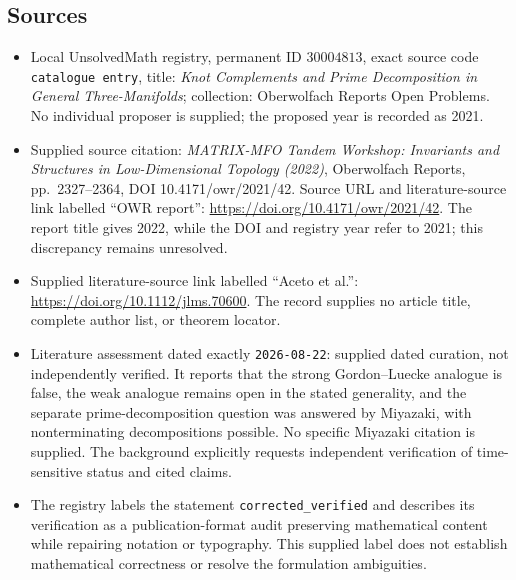 \documentclass[11pt]{article}
\begin{document}
\subsection{Sources}
\begin{itemize}
\item Local UnsolvedMath registry, permanent ID \(30004813\), exact source code \texttt{catalogue entry}, title: \emph{Knot Complements and Prime Decomposition in General Three-Manifolds}; collection: Oberwolfach Reports Open Problems. No individual proposer is supplied; the proposed year is recorded as 2021.
\item Supplied source citation: \emph{MATRIX-MFO Tandem Workshop: Invariants and Structures in Low-Dimensional Topology (2022)}, Oberwolfach Reports, pp.\ 2327--2364, DOI 10.4171/owr/2021/42. Source URL and literature-source link labelled ``OWR report'': \url{https://doi.org/10.4171/owr/2021/42}. The report title gives 2022, while the DOI and registry year refer to 2021; this discrepancy remains unresolved.
\item Supplied literature-source link labelled ``Aceto et al.'': \url{https://doi.org/10.1112/jlms.70600}. The record supplies no article title, complete author list, or theorem locator.
\item Literature assessment dated exactly \texttt{2026-08-22}: supplied dated curation, not independently verified. It reports that the strong Gordon--Luecke analogue is false, the weak analogue remains open in the stated generality, and the separate prime-decomposition question was answered by Miyazaki, with nonterminating decompositions possible. No specific Miyazaki citation is supplied. The background explicitly requests independent verification of time-sensitive status and cited claims.
\item The registry labels the statement \texttt{corrected\_verified} and describes its verification as a publication-format audit preserving mathematical content while repairing notation or typography. This supplied label does not establish mathematical correctness or resolve the formulation ambiguities.
\end{itemize}
\end{document}
